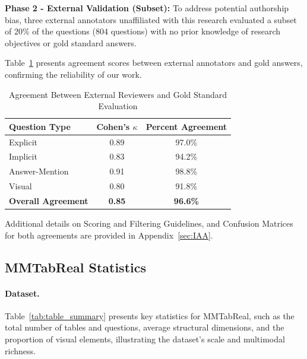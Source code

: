 \documentclass[11pt]{article}
\newcommand{\datasetName}{{\sc MMTabReal}\xspace}
\begin{document}
\noindent \textbf{Phase 2 - External Validation (Subset):} To address potential authorship bias, three external annotators unaffiliated with this research evaluated a subset of 20\% of the questions (804 questions) with no prior knowledge of research objectives or gold standard answers.

Table~\ref{tab:third_reviewer_agreement} presents agreement scores between external annotators and gold answers, confirming the reliability of our work.

\begin{table}[htbp]
\vspace{-0.5em}
\centering
\small
\setlength{\aboverulesep}{0pt}
\setlength{\belowrulesep}{0pt}
\setlength{\tabcolsep}{5pt}
\begin{tabular}{lcc}
\toprule
\textbf{Question Type} & \textbf{Cohen's $\kappa$} & \textbf{Percent Agreement} \\
\midrule
Explicit & 0.89 & 97.0\% \\
Implicit & 0.83 & 94.2\% \\
Answer-Mention & 0.91 & 98.8\% \\
Visual & 0.80 & 91.8\% \\
\midrule
\rowcolor{yellow!20}\textbf{Overall Agreement} & \textbf{0.85} & \textbf{96.6\%} \\
\bottomrule
\end{tabular}
\vspace{-0.5em}
\caption{\small Agreement Between External Reviewers and Gold Standard Evaluation}
\label{tab:third_reviewer_agreement}
\vspace{-1.0em}
\end{table}

Additional details on Scoring and Filtering Guidelines, and Confusion Matrices for both agreements are provided in Appendix~\ref{sec:IAA}.

\subsection{\datasetName Statistics}
\label{sec:dataset_statistics}
\paragraph{Dataset.}
Table~\ref{tab:table_summary} presents key statistics for \datasetName, such as the total number of tables and questions, average structural dimensions, and the proportion of visual elements, illustrating the dataset’s scale and multimodal richness.
\end{document}

